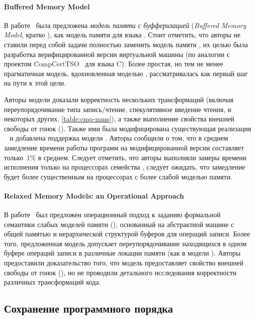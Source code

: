 \paragraph{Buffered Memory Model}

В работе~\cite{Demange-al:POPL13} была предложена 
\emph{модель памяти с буфферизацией}
(\emph{Buffered Memory Model}, кратко \BMM), 
как модель памяти для языка \Java. 
Стоит отметить, что авторы не ставили перед собой задачи
полностью заменить модель памяти \Java, 
их целью была разработка верифицированной 
версии виртуальной машины \Java
(по аналогии с проектом CompCertTSO~\cite{Sevcik-al:JACM13} для языка C). 
Более простая, но тем не менее прагматичная модель, 
вдохновленная моделью \TSO, рассматривалась 
как первый шаг на пути к этой цели. 

Авторы модели доказали корректность нескольких трансформаций
(включая переупорядочивание типа запись/чтение, 
спекулятивное введение чтения, и некоторых других, 
\see \cref{table:cmp-mms}), 
а также выполнение свойства внешней свободы от гонок (\eDRF).
Также ими была модифицирована существующая реализация 
\JVM~\cite{Pizlo-al:ECCS10} и добавлена поддержка модели \BMM. 
Авторы сообщили о том, что в среднем замедление времени работы 
программ на модифицированной версии \JVM составляет только~1\% в среднем. 
Следует отметить, что авторы выполняли замеры времени исполнения 
только на процессорах семейства \Intel, 
следует ожидать, что замедление будет более существенным 
на процессорах с более слабой моделью памяти. 

\paragraph{Relaxed Memory Models: an Operational Approach}

В работе~\cite{Boudol-Petri:POPL09} был предложен 
операционный подход к заданию формальной семантики 
слабых моделей памяти (\RMMOA), 
основанный на абстрактной машине с общей памятью 
и иерархической структурой буферов для операций записи.
Более того, предложенная модель допускает
переупорядочивание находящихся в одном буфере
операций записи в различные локации памяти
(как в модели \PSO).
Авторы предоставили доказательство того,
что модель предоставляет свойство внешней свободы от гонок (\eDRF), 
но не проводили детального исследования 
корректности различных трансформаций кода. 

\subsection{Сохранение программного порядка}
\label{sec:catalog:porf}


